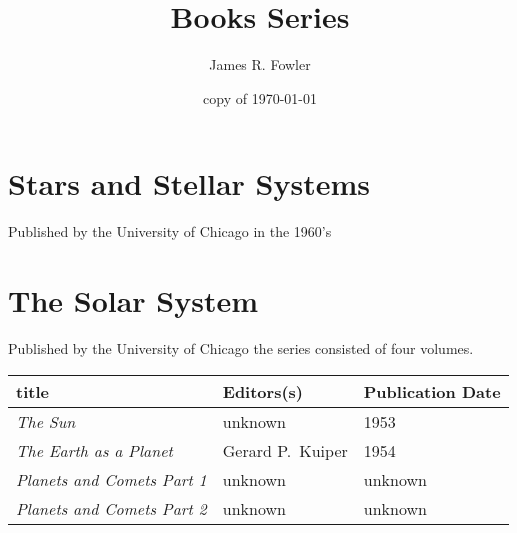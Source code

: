 \documentclass{article}
\begin{document}
\title{Books Series}
\author{James R. Fowler}
\date{copy of \today}
\maketitle

\tableofcontents



\section{Stars and Stellar Systems}

Published by the University of Chicago in the 1960's

\section{The Solar System}

Published by the University of Chicago the series consisted of four volumes.

\begin{tabular}{l l l}
  title & Editors(s) & Publication Date \\  \hline
  {\it The Sun} & unknown & 1953 \\
  {\it The Earth as a Planet} & Gerard P.\ Kuiper & 1954 \\
  {\it Planets and Comets Part 1} & unknown & unknown \\
  {\it Planets and Comets Part 2} & unknown & unknown \\  \hline
\end{tabular}
\end{document}
